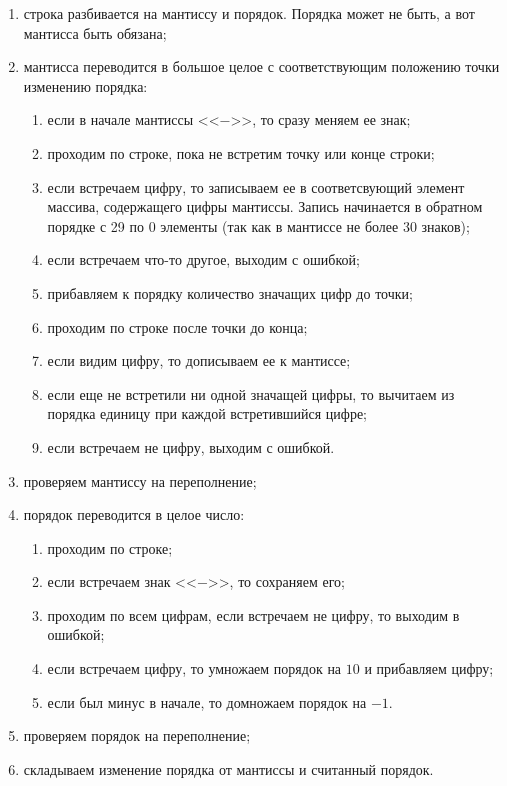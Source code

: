 \documentclass[a4paper,12pt]{extarticle}
\begin{document}
\begin{enumerate}
    \item строка разбивается на мантиссу и порядок. Порядка может не быть, а вот мантисса быть обязана;
    \item мантисса переводится в большое целое с соответствующим положению точки изменению порядка:
    \begin{enumerate}
        \item если в начале мантиссы <<$-$>>, то сразу меняем ее знак;
        \item проходим по строке, пока не встретим точку или конце строки;
        \item если встречаем цифру, то записываем ее в соответсвующий элемент массива, содержащего цифры мантиссы. Запись начинается в обратном порядке с 29 по 0 элементы (так как в мантиссе не более 30 знаков);
        \item если встречаем что-то другое, выходим с ошибкой;
        \item прибавляем к порядку количество значащих цифр до точки;
        \item проходим по строке после точки до конца;
        \item если видим цифру, то дописываем ее к мантиссе;
        \item если еще не встретили ни одной значащей цифры, то вычитаем из порядка единицу при каждой встретившийся цифре;
        \item если встречаем не цифру, выходим с ошибкой.
    \end{enumerate}
    \item проверяем мантиссу на переполнение;
    \item порядок переводится в целое число:
    \begin{enumerate}
        \item проходим по строке;
        \item если встречаем знак <<$-$>>, то сохраняем его;
        \item проходим по всем цифрам, если встречаем не цифру, то выходим в ошибкой;
        \item если встречаем цифру, то умножаем порядок на $10$ и прибавляем цифру;
        \item если был минус в начале, то домножаем порядок на $-1$.
    \end{enumerate}
    \item проверяем порядок на переполнение;
    \item складываем изменение порядка от мантиссы и считанный порядок.
\end{enumerate}
\end{document}
